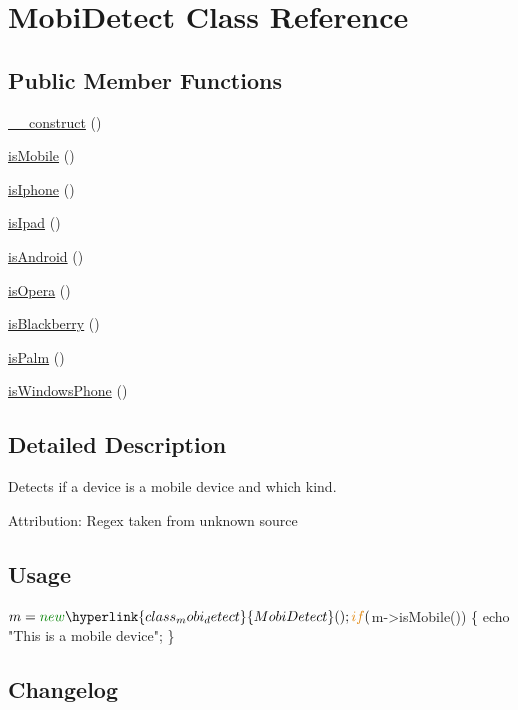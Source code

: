 \hypertarget{class_mobi_detect}{\section{Mobi\-Detect Class Reference}
\label{class_mobi_detect}
}
\subsection*{Public Member Functions}
\begin{DoxyCompactItemize}
\item 
\hyperlink{class_mobi_detect_a095c5d389db211932136b53f25f39685}{\-\_\-\-\_\-construct} ()
\item 
\hyperlink{class_mobi_detect_aa03affe506ea70c6d04fab89fee473fc}{is\-Mobile} ()
\item 
\hyperlink{class_mobi_detect_abef4c1a6a8052c28a3c2dec49d3f9e9b}{is\-Iphone} ()
\item 
\hyperlink{class_mobi_detect_a2d202f72c3038ed6852aebff550dc531}{is\-Ipad} ()
\item 
\hyperlink{class_mobi_detect_abcbe8c4d1560467d47a8e19fe4554c85}{is\-Android} ()
\item 
\hyperlink{class_mobi_detect_a8a2049e411c252249d5264f87f2a894c}{is\-Opera} ()
\item 
\hyperlink{class_mobi_detect_a5eea8483425fa1d463e9df4b9e6f955b}{is\-Blackberry} ()
\item 
\hyperlink{class_mobi_detect_a1342be6bfbf8c34d00c89b8a880ac61e}{is\-Palm} ()
\item 
\hyperlink{class_mobi_detect_abd0a3ffcb33cbef4d23adbede9e3fcd4}{is\-Windows\-Phone} ()
\end{DoxyCompactItemize}


\subsection{Detailed Description}
Detects if a device is a mobile device and which kind.

Attribution\-: Regex taken from unknown source\hypertarget{nav1_usage}{}\subsection{Usage}\label{nav1_usage}

\begin{DoxyCode}
$m = \textcolor{keyword}{new} \hyperlink{class_mobi_detect}{MobiDetect}();

\textcolor{keywordflow}{if} ($m->isMobile()) \{
  echo \textcolor{stringliteral}{"This is a mobile device"};
\}
\end{DoxyCode}
\hypertarget{nav1_changelog}{}\subsection{Changelog}\label{nav1_changelog}
